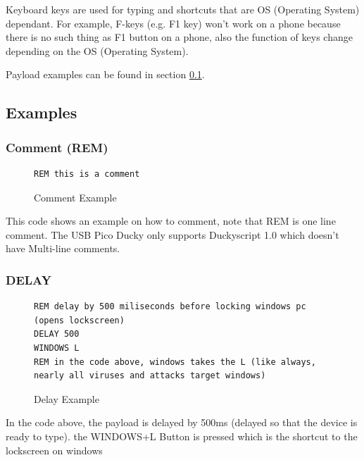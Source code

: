 \documentclass[a4paper,12pt]{article}
\begin{document}
Keyboard keys are used for typing and shortcuts that are OS (Operating System) dependant. For example, F-keys (e.g. F1 key) won't work on a phone because there is no such thing as F1 button on a phone, also the function of keys change depending on the OS (Operating System).

Payload examples can be found in section \ref{duckyscript_examples}.

\subsection{Examples}\label{duckyscript_examples}

\subsubsection{Comment (REM)}

\begin{figure}[htb]
\begin{small}
\begin{lstlisting}[language=Ducky]
REM this is a comment
\end{lstlisting}
\end{small}
\caption{Comment Example}
\end{figure}

This code shows an example on how to comment, note that REM is one line comment. The USB Pico Ducky only supports Duckyscript 1.0 which doesn't have Multi-line comments.

\subsubsection{DELAY}

\begin{figure}[htb]
\begin{small}
\begin{lstlisting}[language=Ducky]
REM delay by 500 miliseconds before locking windows pc (opens lockscreen)
DELAY 500
WINDOWS L
REM in the code above, windows takes the L (like always, nearly all viruses and attacks target windows)
\end{lstlisting}
\end{small}
\caption{Delay Example}
\end{figure}

In the code above, the payload is delayed by 500ms (delayed so that the device is ready to type). the WINDOWS+L Button is pressed which is the shortcut to the lockscreen on windows
\end{document}
